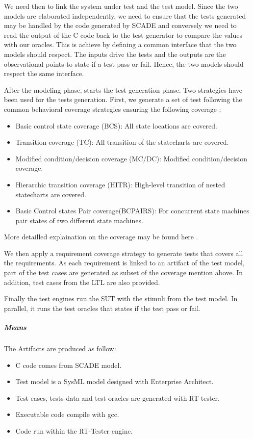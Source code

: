 We need then to link the system under test and the test model. Since
the two models are elaborated independently, we need to ensure that
the tests generated may be handled by the code generated by SCADE and
conversely we need to read the output of the C code back to the test
generator to compare the values with our oracles. This is achieve by
defining a common interface that the two models should respect. The
inputs drive the tests and the outputs are the observational points to
state if a test pass or fail. Hence, the two models should respect the
same interface.

After the modeling phase, starts the test generation phase.
Two strategies have been used for the tests generation. First, we
generate a set of test following the common behavioral coverage
strategies ensuring the following coverage :
\begin{itemize}
\item  Basic control state coverage (BCS): All state locations are covered.
\item  Transition coverage (TC): All transition of the statecharts are covered.
\item  Modified condition/decision coverage (MC/DC): Modified condition/decision coverage.
\item  Hierarchic transition coverage (HITR): High-level transition of
  nested statecharts are covered.
\item  Basic Control states Pair coverage(BCPAIRS): For concurrent state
  machines pair states of two different state machines. 
\end{itemize}

More detailled explaination on the coverage may be found here \cite{huang_test_2013}.

We then apply a requirement coverage strategy to
generate tests that covers all the requirements. 
As each requirement
is linked to an artifact of the test model, part of the test cases
are generated as subset of the coverage mention above. In addition,
test cases from the LTL are also provided.


Finally the test engines run the SUT with the stimuli from the test
model. In parallel, it runs the test oracles that states if the test
pass or fail.

\subparagraph{Means}

The Artifacts are produced as follow:
\begin{itemize}
\item C code comes from SCADE model.
\item Test model is a SysML model designed with Enterprise Architect.
\item Test cases, tests data and test oracles are generated with RT-tester.
\item Executable code compile with gcc.
\item Code run within the RT-Tester engine.
\end{itemize}

